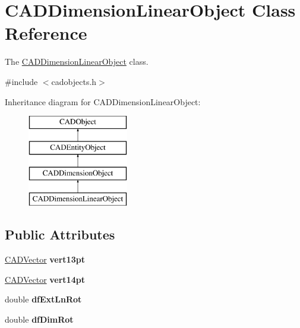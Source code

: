 \hypertarget{class_c_a_d_dimension_linear_object}{}\section{C\+A\+D\+Dimension\+Linear\+Object Class Reference}
\label{class_c_a_d_dimension_linear_object}


The \hyperlink{class_c_a_d_dimension_linear_object}{C\+A\+D\+Dimension\+Linear\+Object} class.  




{\ttfamily \#include $<$cadobjects.\+h$>$}

Inheritance diagram for C\+A\+D\+Dimension\+Linear\+Object\+:\begin{figure}[H]
\begin{center}
\leavevmode
\includegraphics[height=4.000000cm]{class_c_a_d_dimension_linear_object}
\end{center}
\end{figure}
\subsection*{Public Attributes}
\begin{DoxyCompactItemize}
\item 
\hyperlink{class_c_a_d_vector}{C\+A\+D\+Vector} {\bfseries vert13pt}\hypertarget{class_c_a_d_dimension_linear_object_a78fd608b35b8c7f4ecc8f70847284b0a}{}\label{class_c_a_d_dimension_linear_object_a78fd608b35b8c7f4ecc8f70847284b0a}

\item 
\hyperlink{class_c_a_d_vector}{C\+A\+D\+Vector} {\bfseries vert14pt}\hypertarget{class_c_a_d_dimension_linear_object_ac18334779c4a44c130103f16561af5f7}{}\label{class_c_a_d_dimension_linear_object_ac18334779c4a44c130103f16561af5f7}

\item 
double {\bfseries df\+Ext\+Ln\+Rot}\hypertarget{class_c_a_d_dimension_linear_object_a5ae041a71709e63d0eb780aa9e0f1374}{}\label{class_c_a_d_dimension_linear_object_a5ae041a71709e63d0eb780aa9e0f1374}

\item 
double {\bfseries df\+Dim\+Rot}\hypertarget{class_c_a_d_dimension_linear_object_aa459202a1ac41ed5c4ffdf5613d5be19}{}\label{class_c_a_d_dimension_linear_object_aa459202a1ac41ed5c4ffdf5613d5be19}

\end{DoxyCompactItemize}
